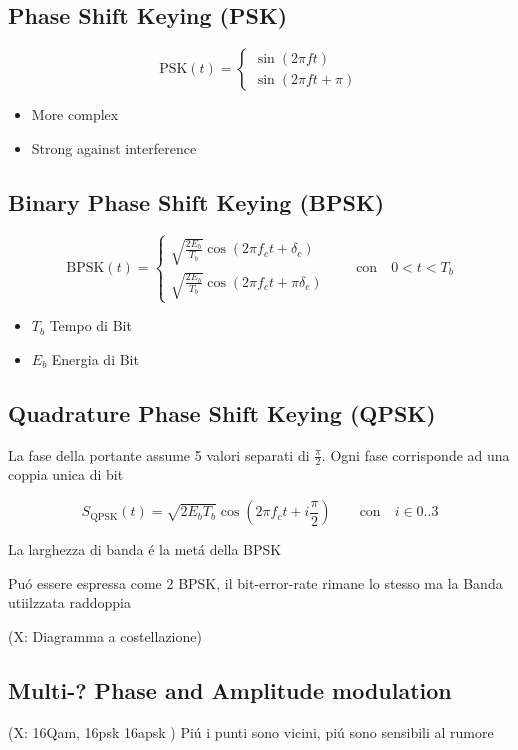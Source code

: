 \documentclass{article}
\begin{document}
\subsection{Phase Shift Keying (PSK)}
\[
    \text{PSK}(t) =
    \begin{cases}
        \sin (2\pi f t)\\
        \sin (2 \pi f t + \pi)
    \end{cases}
\]
\begin{itemize}
    \item More complex
    \item Strong against interference
\end{itemize}

\subsection{Binary Phase Shift Keying (BPSK)}
\[
    \text{BPSK}(t) =
    \begin{cases}
        \sqrt{\frac{2E_b}{T_b}} \cos (2\pi f_c t + \delta_c)\\
        \sqrt{\frac{2E_b}{T_b}} \cos (2\pi f_c t + \pi \delta_c)
    \end{cases}
    \qquad \text{con} \quad 0 < t < T_b
\]
\begin{itemize}
    \item $T_b$ Tempo di Bit
    \item $E_b$ Energia di Bit
\end{itemize}

\subsection{Quadrature Phase Shift Keying (QPSK)}
La fase della portante assume 5 valori separati di $\frac{\pi}{2}$. Ogni fase corrisponde ad una coppia unica di bit

\[
    S_{\text{QPSK}}(t) = \sqrt{{2E_b}{T_b}} \cos (2\pi f_c t + i\frac{\pi}{2}) \qquad \text{con} \quad i \in 0..3
\]

La larghezza di banda \'e la met\'a della BPSK

Pu\'o essere espressa come 2 BPSK, il bit-error-rate rimane lo stesso ma la Banda utiilzzata raddoppia

(X: Diagramma a costellazione)

\subsection{Multi-? Phase and Amplitude modulation}
(X: 16Qam, 16psk 16apsk )
Pi\'u i punti sono vicini, pi\'u sono sensibili al rumore
\end{document}
